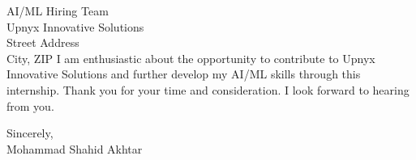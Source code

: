 \documentclass[10.5pt]{letter}
\begin{document}
\begin{letter}{AI/ML Hiring Team\\Upnyx Innovative Solutions\\Street Address\\City, ZIP}
\vspace{0.5cm}
I am enthusiastic about the opportunity to contribute to Upnyx Innovative Solutions and further develop my AI/ML skills through this internship. Thank you for your time and consideration. I look forward to hearing from you.

\vspace{0.5cm}
\begin{flushleft}
Sincerely,\\[2ex]
Mohammad Shahid Akhtar
\end{flushleft}

\end{letter}
\end{document}
